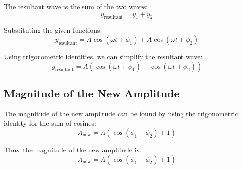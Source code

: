 \documentclass{article}
\begin{document}
The resultant wave is the sum of the two waves:
\[
y_{\text{resultant}} = y_1 + y_2
\]

Substituting the given functions:
\[
y_{\text{resultant}} = A \cos(\omega t + \phi_1) + A \cos(\omega t + \phi_2)
\]

Using trigonometric identities, we can simplify the resultant wave:
\[
y_{\text{resultant}} = A (\cos(\omega t + \phi_1) + \cos(\omega t + \phi_2))
\]

\subsection*{Magnitude of the New Amplitude}

The magnitude of the new amplitude can be found by using the trigonometric identity for the sum of cosines:
\[
A_{\text{new}} = A \left( \cos(\phi_1 - \phi_2) + 1 \right)
\]

Thus, the magnitude of the new amplitude is:
\[
A_{\text{new}} = A \left( \cos(\phi_1 - \phi_2) + 1 \right)
\]
\end{document}
